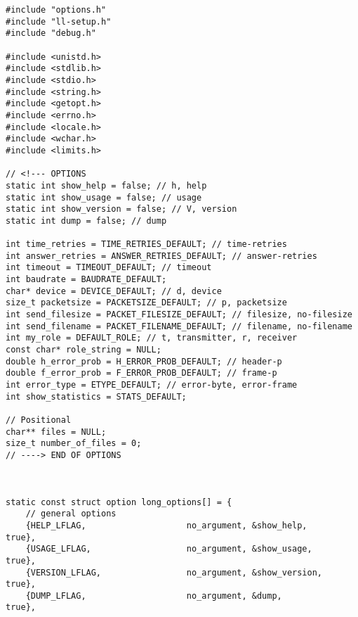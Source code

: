 \documentclass[subfiles]{main.tex}
\begin{document}
\begin{lstlisting}[style=rcom]
#include "options.h"
#include "ll-setup.h"
#include "debug.h"

#include <unistd.h>
#include <stdlib.h>
#include <stdio.h>
#include <string.h>
#include <getopt.h>
#include <errno.h>
#include <locale.h>
#include <wchar.h>
#include <limits.h>

// <!--- OPTIONS
static int show_help = false; // h, help
static int show_usage = false; // usage
static int show_version = false; // V, version
static int dump = false; // dump

int time_retries = TIME_RETRIES_DEFAULT; // time-retries
int answer_retries = ANSWER_RETRIES_DEFAULT; // answer-retries
int timeout = TIMEOUT_DEFAULT; // timeout
int baudrate = BAUDRATE_DEFAULT;
char* device = DEVICE_DEFAULT; // d, device
size_t packetsize = PACKETSIZE_DEFAULT; // p, packetsize
int send_filesize = PACKET_FILESIZE_DEFAULT; // filesize, no-filesize
int send_filename = PACKET_FILENAME_DEFAULT; // filename, no-filename
int my_role = DEFAULT_ROLE; // t, transmitter, r, receiver
const char* role_string = NULL;
double h_error_prob = H_ERROR_PROB_DEFAULT; // header-p
double f_error_prob = F_ERROR_PROB_DEFAULT; // frame-p
int error_type = ETYPE_DEFAULT; // error-byte, error-frame
int show_statistics = STATS_DEFAULT;

// Positional
char** files = NULL;
size_t number_of_files = 0;
// ----> END OF OPTIONS



static const struct option long_options[] = {
	// general options
	{HELP_LFLAG,                    no_argument, &show_help,                true},
	{USAGE_LFLAG,                   no_argument, &show_usage,               true},
	{VERSION_LFLAG,                 no_argument, &show_version,             true},
	{DUMP_LFLAG,                    no_argument, &dump,                     true},
	

\end{lstlisting}
\end{document}
